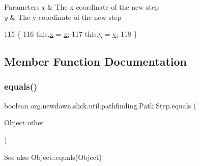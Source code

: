 \begin{DoxyParams}{Parameters}
{\em x} & The x coordinate of the new step \\
\hline
{\em y} & The y coordinate of the new step \\
\hline
\end{DoxyParams}

\begin{DoxyCode}
115                                   \{
116             this.\mbox{\hyperlink{classorg_1_1newdawn_1_1slick_1_1util_1_1pathfinding_1_1_path_1_1_step_a6764404c2d713db22efbeb2ec33cbdc1}{x}} = \mbox{\hyperlink{classorg_1_1newdawn_1_1slick_1_1util_1_1pathfinding_1_1_path_1_1_step_a6764404c2d713db22efbeb2ec33cbdc1}{x}};
117             this.\mbox{\hyperlink{classorg_1_1newdawn_1_1slick_1_1util_1_1pathfinding_1_1_path_1_1_step_ae77364516b69d2b5ed5ed550413c05e9}{y}} = \mbox{\hyperlink{classorg_1_1newdawn_1_1slick_1_1util_1_1pathfinding_1_1_path_1_1_step_ae77364516b69d2b5ed5ed550413c05e9}{y}};
118         \}
\end{DoxyCode}


\subsection{Member Function Documentation}
\mbox{\label{classorg_1_1newdawn_1_1slick_1_1util_1_1pathfinding_1_1_path_1_1_step_ad767acab38daf546a3b32b003aa6170b}} 
\subsubsection{\texorpdfstring{equals()}{equals()}}
{\footnotesize\ttfamily boolean org.\+newdawn.\+slick.\+util.\+pathfinding.\+Path.\+Step.\+equals (\begin{DoxyParamCaption}\item[{Object}]{other }\end{DoxyParamCaption})\hspace{0.3cm}{\ttfamily [inline]}}

\begin{DoxySeeAlso}{See also}
Object\+::equals(\+Object) 
\end{DoxySeeAlso}

